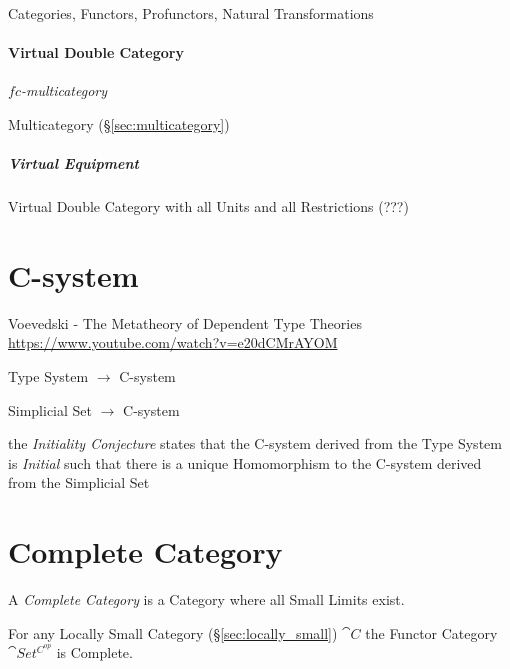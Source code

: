 Categories, Functors, Profunctors, Natural Transformations



\paragraph{Virtual Double Category}\label{sec:virtual_double_category}\hfill

\emph{$fc$-multicategory}

Multicategory (\S\ref{sec:multicategory})



\subparagraph{Virtual Equipment}\label{sec:virtual_equipment}\hfill

Virtual Double Category with all Units and all Restrictions (???)



\section{C-system}\label{sec:c_system}

Voevedski - The Metatheory of Dependent Type Theories
\url{https://www.youtube.com/watch?v=e20dCMrAYOM}

Type System $\rightarrow$ C-system

Simplicial Set $\rightarrow$ C-system

the \emph{Initiality Conjecture} states that the C-system derived from
the Type System is \emph{Initial} such that there is a unique
Homomorphism to the C-system derived from the Simplicial Set



\section{Complete Category}\label{sec:complete_category}

A \emph{Complete Category} is a Category where all Small Limits exist.

For any Locally Small Category (\S\ref{sec:locally_small})
$\cat{C}$ the Functor Category $\cat{Set^{C^{op}}}$ is Complete.



